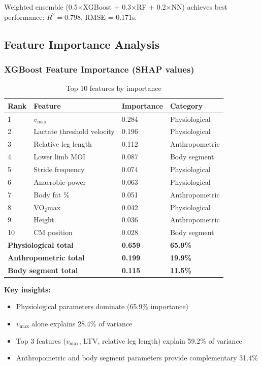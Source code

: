Weighted ensemble (0.5×XGBoost + 0.3×RF + 0.2×NN) achieves best performance: $R^2 = 0.798$, RMSE = 0.171s.

\subsection{Feature Importance Analysis}

\subsubsection{XGBoost Feature Importance (SHAP values)}

\begin{table}[H]
\centering
\caption{Top 10 features by importance}
\begin{tabular}{@{}llll@{}}
\toprule
\textbf{Rank} & \textbf{Feature} & \textbf{Importance} & \textbf{Category} \\
\midrule
1 & $v_{\max}$ & 0.284 & Physiological \\
2 & Lactate threshold velocity & 0.196 & Physiological \\
3 & Relative leg length & 0.112 & Anthropometric \\
4 & Lower limb MOI & 0.087 & Body segment \\
5 & Stride frequency & 0.074 & Physiological \\
6 & Anaerobic power & 0.063 & Physiological \\
7 & Body fat \% & 0.051 & Anthropometric \\
8 & VO$_2$max & 0.042 & Physiological \\
9 & Height & 0.036 & Anthropometric \\
10 & CM position & 0.028 & Body segment \\
\midrule
\multicolumn{2}{l}{\textbf{Physiological total}} & \textbf{0.659} & \textbf{65.9\%} \\
\multicolumn{2}{l}{\textbf{Anthropometric total}} & \textbf{0.199} & \textbf{19.9\%} \\
\multicolumn{2}{l}{\textbf{Body segment total}} & \textbf{0.115} & \textbf{11.5\%} \\
\bottomrule
\end{tabular}
\end{table}

\textbf{Key insights:}
\begin{itemize}
    \item Physiological parameters dominate (65.9\% importance)
    \item $v_{\max}$ alone explains 28.4\% of variance
    \item Top 3 features ($v_{\max}$, LTV, relative leg length) explain 59.2\% of variance
    \item Anthropometric and body segment parameters provide complementary 31.4\%
\end{itemize}

